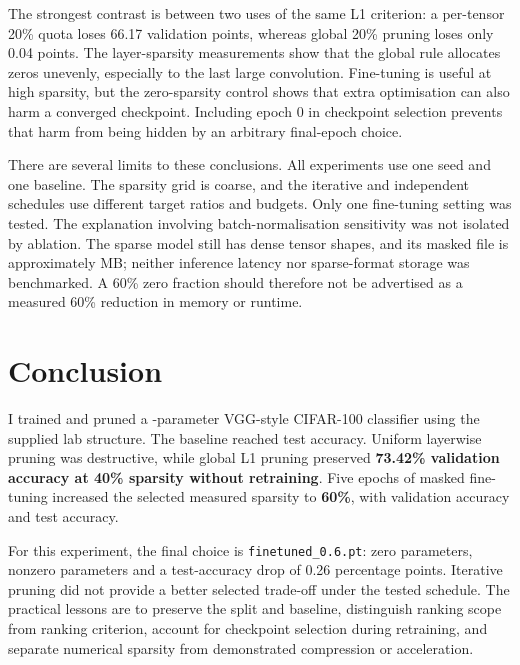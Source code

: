 \documentclass[11pt,a4paper]{article}
\newcommand{\code}[1]{\texttt{#1}}
\begin{document}
The strongest contrast is between two uses of the same L1 criterion: a per-tensor 20\% quota loses 66.17 validation points, whereas global 20\% pruning loses only 0.04 points. The layer-sparsity measurements show that the global rule allocates zeros unevenly, especially to the last large convolution. Fine-tuning is useful at high sparsity, but the zero-sparsity control shows that extra optimisation can also harm a converged checkpoint. Including epoch 0 in checkpoint selection prevents that harm from being hidden by an arbitrary final-epoch choice.

There are several limits to these conclusions. All experiments use one seed and one baseline. The sparsity grid is coarse, and the iterative and independent schedules use different target ratios and budgets. Only one fine-tuning setting was tested. The explanation involving batch-normalisation sensitivity was not isolated by ablation. The sparse model still has dense tensor shapes, and its masked file is approximately \FinalMB{} MB; neither inference latency nor sparse-format storage was benchmarked. A 60\% zero fraction should therefore not be advertised as a measured 60\% reduction in memory or runtime.

\section{Conclusion}

I trained and pruned a \NParameters-parameter VGG-style CIFAR-100 classifier using the supplied lab structure. The baseline reached \BaselineTest{} test accuracy. Uniform layerwise pruning was destructive, while global L1 pruning preserved \textbf{73.42\% validation accuracy at 40\% sparsity without retraining}. Five epochs of masked fine-tuning increased the selected measured sparsity to \textbf{60\%}, with \SelectedVal{} validation accuracy and \SelectedTest{} test accuracy.

For this experiment, the final choice is \code{finetuned\_0.6.pt}: \SelectedZeros{} zero parameters, \SelectedNonzero{} nonzero parameters and a test-accuracy drop of 0.26 percentage points. Iterative pruning did not provide a better selected trade-off under the tested schedule. The practical lessons are to preserve the split and baseline, distinguish ranking scope from ranking criterion, account for checkpoint selection during retraining, and separate numerical sparsity from demonstrated compression or acceleration.
\end{document}

